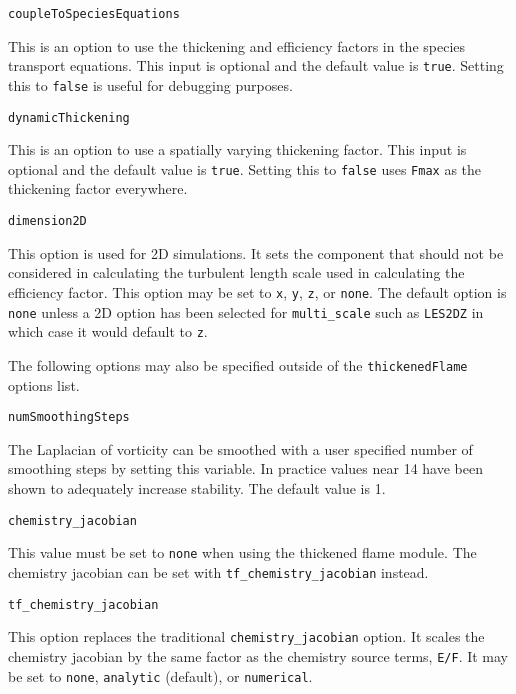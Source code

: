 \documentclass{article}
\begin{document}
\begin{list}{}{}
  \item {\tt coupleToSpeciesEquations}
	  
    This is an option to use the thickening and efficiency factors in the species transport equations. This input is optional and the default value is {\tt true}. Setting this to {\tt false} is useful for debugging purposes.
    
  \item {\tt dynamicThickening}
      
    This is an option to use a spatially varying thickening factor. This input is optional and the default value is {\tt true}. Setting this to {\tt false} uses {\tt Fmax} as the thickening factor everywhere.
	
  \item {\tt dimension2D}
	
	This option is used for 2D simulations. It sets the component that should not be considered in calculating the turbulent length scale used in calculating the efficiency factor. This option may be set to {\tt x}, {\tt y}, {\tt z}, or {\tt none}. The default option is {\tt none} unless a 2D option has been selected for {\tt multi\_scale} such as {\tt LES2DZ} in which case it would default to {\tt z}.

  \end{list}

The following options may also be specified outside of the {\tt thickenedFlame} options list.

	\begin{list}{}{}
	
	\item {\tt numSmoothingSteps} 

	The Laplacian of vorticity can be smoothed with a user specified number of smoothing steps by setting this variable. In practice values near 14 have been shown to adequately increase stability. The default value is 1.
	
	\item {\tt chemistry\_jacobian} 
	
	This value must be set to {\tt none} when using the thickened flame module. The chemistry jacobian can be set with {\tt tf\_chemistry\_jacobian} instead.
	
	\item {\tt tf\_chemistry\_jacobian} 
	
	This option replaces the traditional {\tt chemistry\_jacobian} option. It scales the chemistry jacobian by the same factor as the chemistry source terms, {\tt E/F}. It may be set to {\tt none}, {\tt analytic} (default), or {\tt numerical}.


	\end{list}
\end{document}

